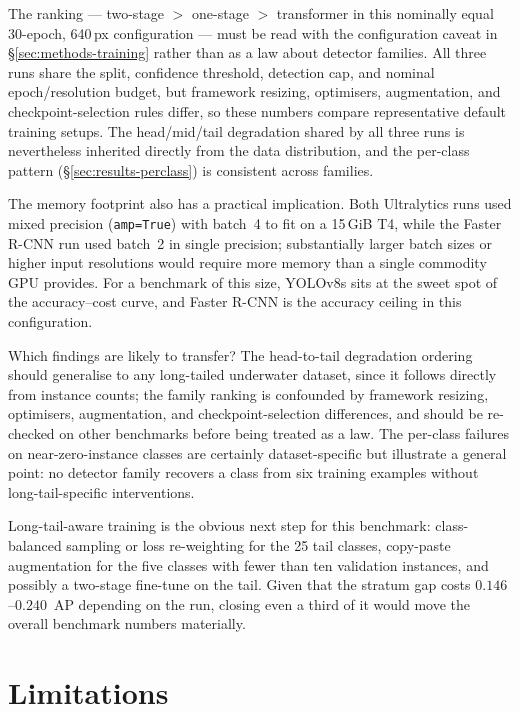 \documentclass[11pt,a4paper,twocolumn]{article}
\begin{document}
The ranking --- two-stage $>$ one-stage $>$ transformer in this nominally equal 30-epoch, 640\,px configuration --- must be read with the configuration caveat in \S\ref{sec:methods-training} rather than as a law about detector families. All three runs share the split, confidence threshold, detection cap, and nominal epoch/resolution budget, but framework resizing, optimisers, augmentation, and checkpoint-selection rules differ, so these numbers compare representative default training setups. The head/mid/tail degradation shared by all three runs is nevertheless inherited directly from the data distribution, and the per-class pattern (\S\ref{sec:results-perclass}) is consistent across families.

The memory footprint also has a practical implication. Both Ultralytics runs used mixed precision (\texttt{amp=True}) with batch~4 to fit on a 15\,GiB T4, while the Faster R-CNN run used batch~2 in single precision;
substantially larger batch sizes or higher input resolutions would
require more memory than a single commodity GPU provides. For a
benchmark of this size, YOLOv8s sits at the sweet spot of the
accuracy--cost curve, and Faster R-CNN is the accuracy ceiling in this configuration.

Which findings are likely to transfer? The head-to-tail degradation
ordering should generalise to any long-tailed underwater dataset, since
it follows directly from instance counts; the family ranking is confounded by framework resizing, optimisers, augmentation, and checkpoint-selection differences, and should be re-checked on other benchmarks before being treated as a law. The per-class failures on near-zero-instance classes
are certainly dataset-specific but illustrate a general point: no
detector family recovers a class from six training examples without
long-tail-specific interventions.

Long-tail-aware training is the obvious next step for this benchmark:
class-balanced sampling or loss re-weighting for the 25 tail classes,
copy-paste augmentation for the five classes with fewer than ten
validation instances, and possibly a two-stage fine-tune on the tail.
Given that the stratum gap costs $0.146$--$0.240$~AP depending on the run, closing even a third of it would move the overall benchmark numbers materially.

\section{Limitations}
\label{sec:limitations}
\end{document}
